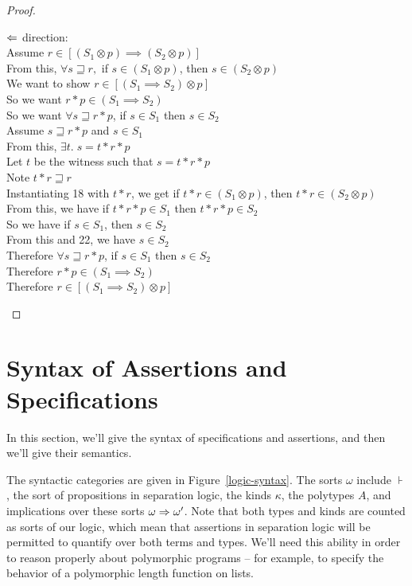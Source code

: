 \begin{proof}
\begin{tabbedproof}
\ooo $\Leftarrow$ direction: \\
\oooo Assume $r \in [(S_1 \otimes p) \implies (S_2 \otimes p)]$ \\
\ooooo From this, $\forall s \sqsupseteq r,$ if $s \in (S_1 \otimes p)$, then $s \in (S_2 \otimes p)$ \\
\ooooo We want to show $r \in [(S_1 \implies S_2) \otimes p]$ \\
\ooooo So we want $r * p \in (S_1 \implies S_2)$ \\
\ooooo So we want $\forall s \sqsupseteq r * p$, if $s \in S_1$ then $s \in S_2$ \\
\ooooo Assume $s \sqsupseteq r * p$ and $s \in S_1$ \\
\oooooo From this, $\exists t.\; s = t * r * p$ \\
\oooooo Let $t$ be the witness such that $s = t * r * p$ \\ 
\ooooooo Note $t * r \sqsupseteq r$ \\
\ooooooo Instantiating 18 with $t * r$, we get if $t * r \in (S_1 \otimes p)$, then $t * r \in (S_2 \otimes p)$ \\
\ooooooo From this, we have if $t * r * p \in S_1$ then $t * r * p \in S_2$ \\
\ooooooo So we have if $s \in S_1$, then $s \in S_2$ \\
\ooooooo From this and 22, we have $s \in S_2$ \\
\ooooo Therefore $\forall s \sqsupseteq r * p$, if $s \in S_1$ then $s \in S_2$ \\
\ooooo Therefore $r * p \in (S_1 \implies S_2)$ \\
\ooooo Therefore $r \in [(S_1 \implies S_2) \otimes p]$ 
\end{tabbedproof}
\end{proof}

\section{Syntax of Assertions and Specifications}

In this section, we'll give the syntax of specifications and
assertions, and then we'll give their semantics.

The syntactic categories are given in Figure~\ref{logic-syntax}. The
sorts $\omega$ include $\assert$, the sort of propositions in
separation logic, the kinds $\kappa$, the polytypes $A$, and
implications over these sorts $\omega \Rightarrow \omega'$. Note that both
types and kinds are counted as sorts of our logic, which mean that
assertions in separation logic will be permitted to quantify over both
terms and types.  We'll need this ability in order to reason properly
about polymorphic programs -- for example, to specify the behavior of
a polymorphic length function on lists.

